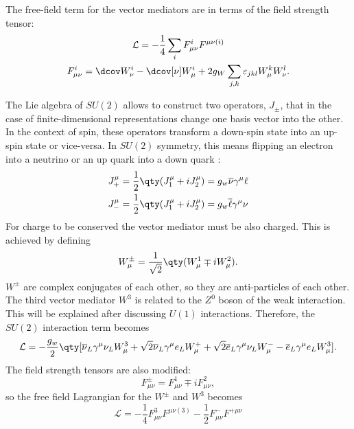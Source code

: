The free-field term for the vector mediators are in terms of the field strength tensor:
\begin{gather}
    \mathcal{L} = -\frac{1}{4} \sum_{i} F_{\mu\nu}^{i} F^{\mu\nu(i)}\\
      F_{\mu\nu}^{i} = \dcov W_{\nu}^{i} - \dcov[\nu] W_{\mu}^{i}+2g_W\sum_{j,k} \varepsilon_{jkl} W_{\mu}^{k}W_{\nu}^{l}.
\end{gather}

The Lie algebra of $SU(2)$ allows to construct two operators, $J_{\pm}$, that in the case of finite-dimensional representations change one basis vector into the other. In the context of spin, these operators transform a down-spin state into an up-spin state or vice-versa. In $SU(2)$ symmetry, this means flipping an electron into a neutrino or an up quark into a down quark \cite{goldberg_standard_2017}:
\begin{align}
    J^\mu_{+} &= \frac{1}{2}\qty(J^\mu_{1}+iJ^{\mu}_{2}) = g_w\overline{\nu}\gamma^{\mu} \ell \\
    J^\mu_{-} &= \frac{1}{2}\qty(J^\mu_{1}+iJ^{\mu}_{2}) = g_w\overline{\ell}\gamma^{\mu} \nu
\end{align}
For charge to be conserved the vector mediator must be also charged. This is achieved by defining
\begin{equation}
    W^{\pm}_\mu = \frac{1}{\sqrt{2}}\qty(W_{\mu}^{1}\mp i W_{\mu}^{2}).
\end{equation}
$W^{\pm}$ are complex conjugates of each other, so they are anti-particles of each other. The third vector mediator $W^3$ is related to the $Z^0$ boson of the weak interaction. This will be explained after discussing $U(1)$ interactions. Therefore, the $SU(2)$ interaction term becomes
\begin{equation}
    \mathcal{L} = -\frac{g_w}{2}\qty[\overline{\nu}_L\gamma^\mu \nu_LW_{\mu}^{3}+\sqrt{2}\overline{\nu}_L\gamma^\mu e_LW_{\mu}^{+}+\sqrt{2}\overline{e}_L\gamma^{\mu}\nu_L W_{\mu}^{-}-\overline{e}_L\gamma^\mu e_L W_{\mu}^{3}].
\end{equation}
The field strength tensors are also modified:
\begin{equation}
    F_{\mu\nu}^{\pm} = F_{\mu\nu}^{1}\mp i F_{\mu\nu}^{2},
\end{equation}
so the free field Lagrangian for the $W^{\pm}$ and $W^{3}$ becomes
\begin{equation}\label{eq:weak-field-lag}
    \mathcal{L} = -\frac{1}{4}F_{\mu\nu}^{3}F^{\mu\nu(3)}-\frac{1}{2}F_{\mu\nu}^{-}F^{+\mu\nu}
\end{equation}
    
